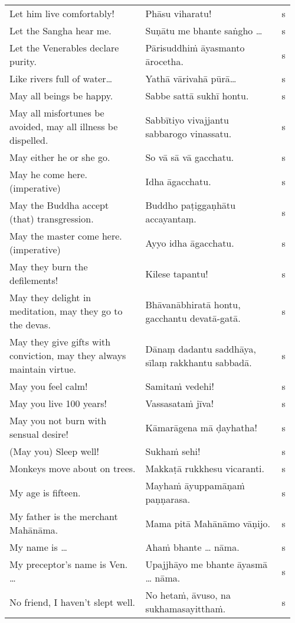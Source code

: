 \documentclass[a5paper]{memoir}
\begin{document}
\begin{longtable}{L{0.48\linewidth} L{0.48\linewidth} H}
Let him live comfortably! & Phāsu viharatu! & s\\[0pt]
Let the Sangha hear me. & Suṇātu me bhante saṅgho \ldots{} & s\\[0pt]
Let the Venerables declare purity. & Pārisuddhiṁ āyasmanto ārocetha. & s\\[0pt]
Like rivers full of water\ldots{} & Yathā vārivahā pūrā\ldots{} & s\\[0pt]
May all beings be happy. & Sabbe sattā sukhī hontu. & s\\[0pt]
May all misfortunes be avoided, may all illness be dispelled. & Sabbītiyo vivajjantu sabbarogo vinassatu. & s\\[0pt]
May either he or she go. & So vā sā vā gacchatu. & s\\[0pt]
May he come here. (imperative) & Idha āgacchatu. & s\\[0pt]
May the Buddha accept (that) transgression. & Buddho paṭiggaṇhātu accayantaṃ. & s\\[0pt]
May the master come here. (imperative) & Ayyo idha āgacchatu. & s\\[0pt]
May they burn the defilements! & Kilese tapantu! & s\\[0pt]
May they delight in meditation, may they go to the devas. & Bhāvanābhiratā hontu, gacchantu devatā-gatā. & s\\[0pt]
May they give gifts with conviction, may they always maintain virtue. & Dānaṃ dadantu saddhāya, sīlaṃ rakkhantu sabbadā. & s\\[0pt]
May you feel calm! & Samitaṁ vedehi! & s\\[0pt]
May you live 100 years! & Vassasataṁ jīva! & s\\[0pt]
May you not burn with sensual desire! & Kāmarāgena mā ḍayhatha! & s\\[0pt]
(May you) Sleep well! & Sukhaṁ sehi! & s\\[0pt]
Monkeys move about on trees. & Makkaṭā rukkhesu vicaranti. & s\\[0pt]
My age is fifteen. & Mayhaṁ āyuppamāṇaṁ paṇṇarasa. & s\\[0pt]
My father is the merchant Mahānāma. & Mama pitā Mahānāmo vāṇijo. & s\\[0pt]
My name is \ldots{} & Ahaṁ bhante \ldots{} nāma. & s\\[0pt]
My preceptor's name is Ven. \ldots{} & Upajjhāyo me bhante āyasmā \ldots{} nāma. & s\\[0pt]
No friend, I haven't slept well. & No hetaṁ, āvuso, na sukhamasayitthaṁ. & s\\[0pt]

\end{longtable}
\end{document}
